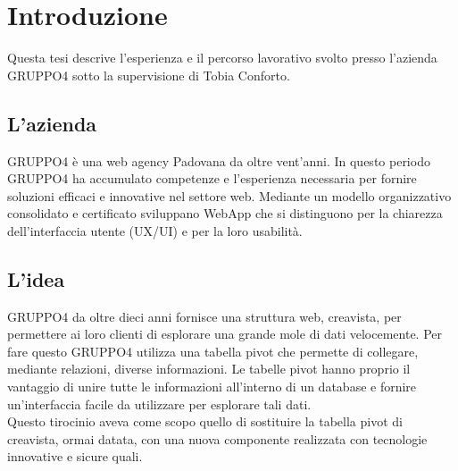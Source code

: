 
\chapter{Introduzione}
\label{cap:introduzione}

Questa tesi descrive l'esperienza e il percorso lavorativo svolto presso l'azienda GRUPPO4 sotto la supervisione di Tobia Conforto.





\section{L'azienda}

GRUPPO4 è una web agency Padovana da oltre vent'anni. In questo periodo GRUPPO4 ha accumulato competenze e l'esperienza necessaria per fornire soluzioni efficaci e innovative nel settore web. Mediante un modello organizzativo consolidato e certificato sviluppano WebApp che si distinguono per la chiarezza dell'interfaccia utente (UX/UI) e per la loro usabilità.

\section{L'idea}

GRUPPO4 da oltre dieci anni fornisce una struttura web, creavista, per permettere ai loro clienti di esplorare una grande mole di dati velocemente. Per fare questo GRUPPO4 utilizza una tabella pivot che permette di collegare, mediante relazioni, diverse informazioni. Le tabelle pivot hanno proprio il vantaggio di unire tutte le informazioni all'interno di un database e fornire un'interfaccia facile da utilizzare per esplorare tali dati. \\
Questo tirocinio aveva come scopo quello di sostituire la tabella pivot di creavista, ormai datata, con una nuova componente realizzata con tecnologie innovative e sicure quali.

